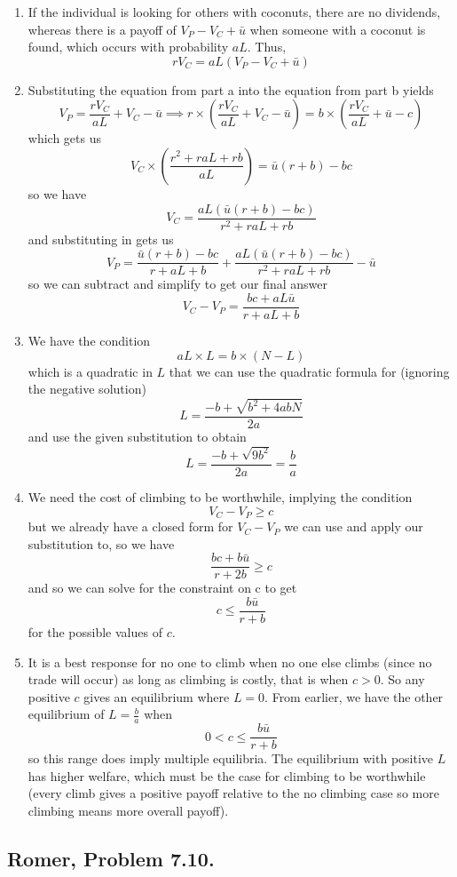 \documentclass[11pt]{amsart}
\begin{document}
\begin{enumerate}[label = (\alph*)]
	\item If the individual is looking for others with coconuts, there are no dividends, whereas there is a payoff of $V_P - V_C + \bar{u}$ when someone with a coconut is found, which occurs with probability $aL$.
	Thus,
	\[
	rV_C = a L (V_P - V_C + \bar{u})
	\]
	\item Substituting the equation from part a into the equation from part b yields
	\[
	V_P = \frac{rV_C}{aL} + V_C - \bar{u} \implies r \times \left(\frac{rV_C}{aL} + V_C - \bar{u}\right) = b \times \left(\frac{rV_C}{aL} + \bar{u} - c\right)
	\]
	which gets us
	\[
	V_C \times \left(\frac{r^2 + r a L + r b}{a L}\right) = \bar{u} (r+b) - bc
	\]
	so we have
	\[
	V_C = \frac{a L ( \bar{u} (r+b) - bc)}{r^2 + r a L + r b}
	\]
	and substituting in gets us
	\[
	V_P = \frac{\bar{u} (r+b) - bc}{r + a L + b} + \frac{a L ( \bar{u} (r+b) - bc)}{r^2 + r a L + r b} - \bar{u}
	\]
	so we can subtract and simplify to get our final answer
	\[
	V_C - V_P = \frac{bc + a L \bar{u}}{r + a L + b}
	\]
	\item We have the condition
	\[
	a L \times L = b \times (N - L)
	\]
	which is a quadratic in $L$ that we can use the quadratic formula for (ignoring the negative solution)
	\[
	L = \frac{-b + \sqrt{b^2 + 4 a b N}}{2a}
	\]
	and use the given substitution to obtain
	\[
	L = \frac{-b + \sqrt{9b^2}}{2a} = \frac{b}{a}
	\]
	\item We need the cost of climbing to be worthwhile, implying the condition
	\[
	V_C - V_P \geq c
	\]
	but we already have a closed form for $V_C - V_P$ we can use and apply our substitution to, so we have
	\[
	\frac{b c + b \bar{u}}{r + 2 b} \geq c
	\]
	and so we can solve for the constraint on c to get
	\[
	c \leq \frac{b \bar{u}}{r + b}
	\]
	for the possible values of $c$.
	\item It is a best response for no one to climb when no one else climbs (since no trade will occur) as long as climbing is costly, that is when $c > 0$. 
	So any positive $c$ gives an equilibrium where $L = 0$. 
	From earlier, we have the other equilibrium of $L = \frac{b}{a}$ when 
	\[
	0 < c \leq \frac{b \bar{u}}{r + b}
	\]
	so this range does imply multiple equilibria.
	The equilibrium with positive $L$ has higher welfare, which must be the case for climbing to be worthwhile (every climb gives a positive payoff relative to the no climbing case so more climbing means more overall payoff).
	
\end{enumerate}
\subsection{Romer, Problem 7.10.}
\end{document}
